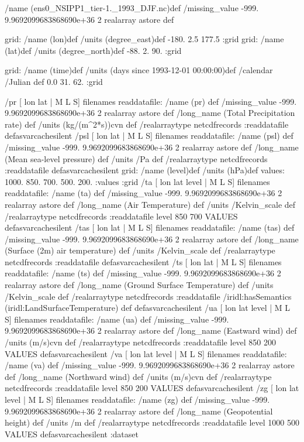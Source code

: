 /name (ens0_NSIPP1_tier-1._1993_DJF.nc)def
 /missing_value -999. 9.9692099683868690e+36 2 realarray astore def
\begin{ingrid}
grid:
/name (lon)def
/units (degree_east)def
 -180. 2.5 177.5
:grid
grid:
/name (lat)def
/units (degree_north)def
 -88. 2. 90.
:grid
\end{ingrid}
grid:
/name (time)def
/units (days since 1993-12-01 00:00:00)def
/calendar /Julian def
 0.0 31. 62.
:grid
\begin{ingrid}
 /pr{
[ lon lat | M L S] filenames readdatafile:
/name (pr) def
 /missing_value -999. 9.9692099683868690e+36 2 realarray astore def
 /long_name (Total Precipitation rate) def
 /units (kg/(m^2*s))cvn def
 /realarraytype netcdfrecords :readdatafile
}defasvarcachesilent
 /psl{
[ lon lat | M L S] filenames readdatafile:
/name (psl) def
 /missing_value -999. 9.9692099683868690e+36 2 realarray astore def
 /long_name (Mean sea-level pressure) def
 /units /Pa def
 /realarraytype netcdfrecords :readdatafile
}defasvarcachesilent
grid:
/name (level)def
/units (hPa)def
values: 1000. 850. 700. 500. 200. :values
:grid
 /ta{
[ lon lat level | M L S] filenames readdatafile:
/name (ta) def
 /missing_value -999. 9.9692099683868690e+36 2 realarray astore def
 /long_name (Air Temperature) def
 /units /Kelvin_scale def
 /realarraytype netcdfrecords :readdatafile
level 850 700 VALUES
}defasvarcachesilent
 /tas{
[ lon lat | M L S] filenames readdatafile:
/name (tas) def
 /missing_value -999. 9.9692099683868690e+36 2 realarray astore def
 /long_name (Surface (2m) air temperature) def
 /units /Kelvin_scale def
 /realarraytype netcdfrecords :readdatafile
}defasvarcachesilent
 /ts{
[ lon lat | M L S] filenames readdatafile:
/name (ts) def
 /missing_value -999. 9.9692099683868690e+36 2 realarray astore def
 /long_name (Ground Surface Temperature) def
 /units /Kelvin_scale def
 /realarraytype netcdfrecords :readdatafile
/iridl:hasSemantics (iridl:LandSurfaceTemperature) def
}defasvarcachesilent
 /ua{
[ lon lat level | M L S] filenames readdatafile:
/name (ua) def
 /missing_value -999. 9.9692099683868690e+36 2 realarray astore def
 /long_name (Eastward wind) def
 /units (m/s)cvn def
 /realarraytype netcdfrecords :readdatafile
level 850 200 VALUES
}defasvarcachesilent
 /va{
[ lon lat level | M L S] filenames readdatafile:
/name (va) def
 /missing_value -999. 9.9692099683868690e+36 2 realarray astore def
 /long_name (Northward wind) def
 /units (m/s)cvn def
 /realarraytype netcdfrecords :readdatafile
level 850 200 VALUES
}defasvarcachesilent
 /zg{
[ lon lat level | M L S] filenames readdatafile:
/name (zg) def
 /missing_value -999. 9.9692099683868690e+36 2 realarray astore def
 /long_name (Geopotential height) def
 /units /m def
 /realarraytype netcdfrecords :readdatafile
level 1000 500 VALUES
}defasvarcachesilent
:dataset
\end{ingrid}